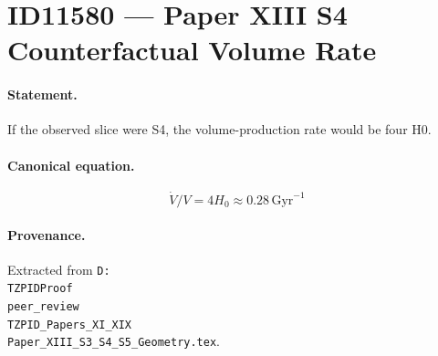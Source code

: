 \section*{ID11580 --- Paper XIII S4 Counterfactual Volume Rate}

\paragraph{Statement.}
If the observed slice were S4, the volume-production rate would be four H0.

\paragraph{Canonical equation.}
\[
\dot V/V=4H_0\approx0.28\,\mathrm{Gyr}^{-1}
\]

\paragraph{Provenance.}
Extracted from \texttt{D:\\TZPIDProof\\peer\_review\\TZPID\_Papers\_XI\_XIX\\Paper\_XIII\_S3\_S4\_S5\_Geometry.tex}.
